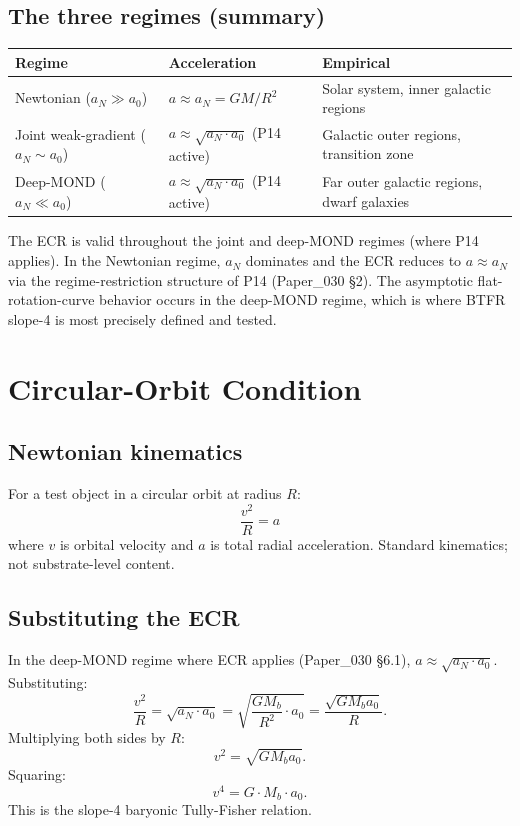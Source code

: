 \documentclass[11pt,a4paper]{article}
\begin{document}
\subsection{The three regimes (summary)}

\begin{center}
\begin{tabular}{p{}p{}p{}}
\toprule
\textbf{Regime} & \textbf{Acceleration} & \textbf{Empirical} \\
\midrule
Newtonian ($a_N \gg a_0$) & $a \approx a_N = GM/R^2$ & Solar system, inner galactic regions \\
Joint weak-gradient ($a_N \sim a_0$) & $a \approx \sqrt{a_N \cdot a_0}$ (P14 active) & Galactic outer regions, transition zone \\
Deep-MOND ($a_N \ll a_0$) & $a \approx \sqrt{a_N \cdot a_0}$ (P14 active) & Far outer galactic regions, dwarf galaxies \\
\bottomrule
\end{tabular}
\end{center}

The ECR is valid throughout the joint and deep-MOND regimes (where P14 applies). In the Newtonian regime, $a_N$ dominates and the ECR reduces to $a \approx a_N$ via the regime-restriction structure of P14 (Paper\_030 \S2). The asymptotic flat-rotation-curve behavior occurs in the deep-MOND regime, which is where BTFR slope-4 is most precisely defined and tested.

\section{Circular-Orbit Condition}

\subsection{Newtonian kinematics}

For a test object in a circular orbit at radius $R$:
\[
\frac{v^2}{R} = a
\]
where $v$ is orbital velocity and $a$ is total radial acceleration. Standard kinematics; not substrate-level content.

\subsection{Substituting the ECR}

In the deep-MOND regime where ECR applies (Paper\_030 \S6.1), $a \approx \sqrt{a_N \cdot a_0}$. Substituting:
\[
\frac{v^2}{R} = \sqrt{a_N \cdot a_0} = \sqrt{\frac{GM_b}{R^2} \cdot a_0} = \frac{\sqrt{GM_b a_0}}{R}.
\]
Multiplying both sides by $R$:
\[
v^2 = \sqrt{G M_b a_0}.
\]
Squaring:
\[
\boxed{v^4 = G \cdot M_b \cdot a_0.}
\]
This is the slope-4 baryonic Tully-Fisher relation.
\end{document}
